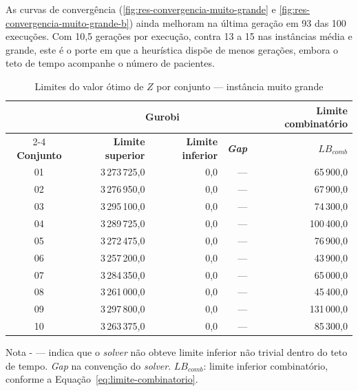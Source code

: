 As curvas de convergência (\autoref{fig:res-convergencia-muito-grande} e \autoref{fig:res-convergencia-muito-grande-b}) ainda melhoram na última geração em 93 das 100 execuções. Com 10,5 gerações por execução, contra 13 a 15 nas instâncias média e grande, este é o porte em que a heurística dispõe de menos gerações, embora o teto de tempo acompanhe o número de pacientes.

\begin{table}[H]
    \caption{Limites do valor ótimo de $Z$ por conjunto --- instância muito grande}
    \label{tab:res-limites-muito-grande}
    \centering
    \begin{tabular}{crrrr}
        \hline
        & \multicolumn{3}{c}{\textbf{Gurobi}} & \textbf{Limite combinatório} \\
        \cline{2-4} \cline{5-5}
        \textbf{Conjunto} & \textbf{Limite superior} & \textbf{Limite inferior} & \textbf{\textit{Gap}} & \textbf{$LB_{comb}$} \\
        \hline
        01 & 3\,273\,725,0 & 0,0 & --- & 65\,900,0 \\
        02 & 3\,276\,950,0 & 0,0 & --- & 67\,900,0 \\
        03 & 3\,295\,100,0 & 0,0 & --- & 74\,300,0 \\
        04 & 3\,289\,725,0 & 0,0 & --- & 100\,400,0 \\
        05 & 3\,272\,475,0 & 0,0 & --- & 76\,900,0 \\
        06 & 3\,257\,200,0 & 0,0 & --- & 43\,900,0 \\
        07 & 3\,284\,350,0 & 0,0 & --- & 65\,000,0 \\
        08 & 3\,261\,000,0 & 0,0 & --- & 45\,400,0 \\
        09 & 3\,297\,800,0 & 0,0 & --- & 131\,000,0 \\
        10 & 3\,263\,375,0 & 0,0 & --- & 85\,300,0 \\
        \hline
    \end{tabular}
    \par\smallskip
    {\footnotesize Nota - --- indica que o \textit{solver} não obteve limite inferior não trivial dentro do teto de tempo. \textit{Gap} na convenção do \textit{solver}. $LB_{comb}$: limite inferior combinatório, conforme a Equação~\eqref{eq:limite-combinatorio}.}
\end{table}

